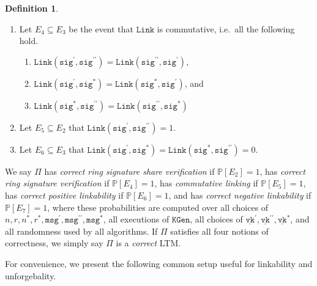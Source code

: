 \documentclass[11pt]{article}
\theoremstyle{definition}
\newtheorem{definition}[definition]{Definition}
\newcommand{\VK}{\underline{\texttt{vk}}}
\newcommand{\sig}{\texttt{sig}}
\newcommand{\msg}{\texttt{msg}}
\newcommand{\keygen}{\texttt{KGen}}
\newcommand{\link}{\texttt{Link}}
\begin{document}
\begin{definition}
\begin{enumerate}
\item Let $E_4 \subseteq E_3$ be the event that $\link$ is commutative, i.e.\ all the following hold.
\begin{enumerate}
\item $\link(\sig^\prime, \sig^{\prime \prime}) = \link(\sig^{\prime \prime}, \sig^\prime)$,
\item $\link(\sig^\prime, \sig^*) = \link(\sig^*, \sig^\prime)$, and
\item $\link(\sig^*, \sig^{\prime \prime}) = \link(\sig^{\prime \prime}, \sig^*)$
\end{enumerate}

\item Let $E_5 \subseteq E_2$ that $\link(\sig^\prime, \sig^{\prime \prime}) = 1$.

\item Let $E_6 \subseteq E_3$ that $\link(\sig^\prime, \sig^*) =  \link(\sig^*, \sig^{\prime \prime})=0$.

\end{enumerate}
We say $\Pi$ has \textit{correct ring signature share verification} if $\mathbb{P}[E_2] = 1$, has \textit{correct ring signature verification} if $\mathbb{P}[E_4] = 1$, has \textit{commutative linking} if $\mathbb{P}[E_5]=1$, has \textit{correct positive linkability} if $\mathbb{P}\left[E_6\right]=1$, and has \textit{correct negative linkability} if $\mathbb{P}\left[E_7\right]=1$, where these probabilities are computed over all choices of $n, r, n^*, r^*, \msg^\prime, \msg^{\prime \prime}, \msg^*$, all executions of $\keygen$, all choices of $\VK^\prime, \VK^{\prime \prime}, \VK^*$, and all randomness used by all algorithms. If $\Pi$ satisfies all four notions of correctness, we simply say $\Pi$ is a \textit{correct} LTM. 
\end{definition}


For convenience, we present the following common setup useful for linkability and unforgebality.
\end{document}

